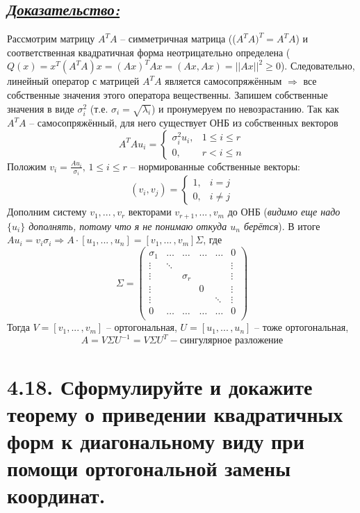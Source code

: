 \documentclass{article}
\begin{document}
\subsection*{\Large \underline{\textit{Доказательство: }}}
Рассмотрим матрицу $A^TA$ -- симметричная матрица (($A^TA)^T = A^TA$) и соответственная квадратичная форма неотрицательно определена ($Q(x) = x^T(A^TA)x = (Ax)^TAx = (Ax, Ax) = ||Ax||^2 \ge 0$). Следовательно, линейный оператор с матрицей $A^TA$ является самосопряжённым $\Rightarrow$ все собственные значения этого оператора вещественны. Запишем собственные значения в виде $\sigma_i^2$ (т.е. $\sigma_i = \sqrt{\lambda_i}$) и пронумеруем по невозрастанию. Так как $A^TA$ -- самосопряжённый, для него существует ОНБ из собственных векторов
$$
A^TAu_i = 
\begin{cases}
\sigma_i^2u_i, & 1 \le i \le r \\
0, & r < i \le n
\end{cases}
$$
Положим $v_i = \frac{Au_i}{\sigma_i}, \, 1 \le i \le r $ -- нормированные собственные векторы:
$$
(v_i, v_j) = 
\begin{cases}
1, & i = j \\
0, & i \ne j
\end{cases}
$$
Дополним систему $v_1, ...\,, v_r$ векторами $v_{r+1}, ...\,, v_{m}$ до ОНБ (\textit{видимо еще надо $\{u_i\}$ дополнять, потому что я не понимаю откуда $u_n$ берётся}).
\newline В итоге $Au_i = v_i\sigma_i \Rightarrow A\cdot[u_1, ...\,, u_n] = [v_1, ...\,, v_m]\Sigma$, где
$$
\Sigma = 
\begin{pmatrix}
\sigma_1 & \dots & \dots & \dots & \dots & 0 \\
\vdots & \ddots & & & &\vdots \\
\vdots &  & \sigma_r & & & \vdots \\
\vdots &  &  & 0 & & \vdots\\
\vdots & & &  & \ddots & \vdots \\
0 & \dots & \dots & \dots & \dots & 0 \\
\end{pmatrix}
$$
Тогда $V = [v_1, ...\,, v_m]$ -- ортогональная, $U = [u_1, ...\,, u_n]$ -- тоже ортогональная,
$$
A = V\Sigma U^{-1} = V\Sigma U^T - \mbox{сингулярное разложение}
$$

\section*{\LARGE 4.18. Сформулируйте и докажите теорему о приведении квадратичных форм к диагональному виду при помощи ортогональной замены координат.  }
\end{document}
